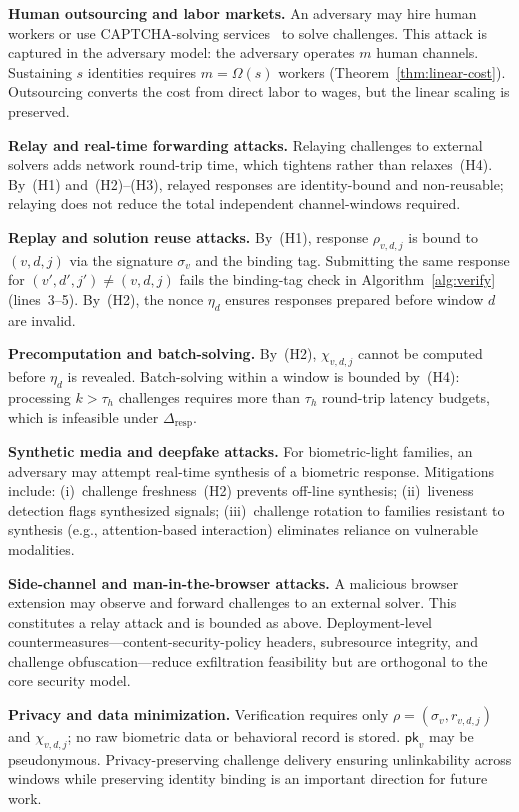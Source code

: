 \documentclass[11pt]{article}
\theoremstyle{remark}
\theoremstyle{plain}
\begin{document}
	\noindent\textbf{Human outsourcing and labor markets.}
	An adversary may hire human workers or use CAPTCHA-solving
	services~\cite{motoyama2010recaptchas} to solve challenges.
	This attack is captured in the adversary model: the adversary operates
	$m$ human channels. Sustaining $s$ identities requires $m = \Omega(s)$
	workers (Theorem~\ref{thm:linear-cost}). Outsourcing converts the cost
	from direct labor to wages, but the linear scaling is preserved.
	
	\noindent\textbf{Relay and real-time forwarding attacks.}
	Relaying challenges to external solvers adds network round-trip time,
	which tightens rather than relaxes~(H4). By~(H1) and~(H2)--(H3),
	relayed responses are identity-bound and non-reusable; relaying does
	not reduce the total independent channel-windows required.
	
	\noindent\textbf{Replay and solution reuse attacks.}
	By~(H1), response $\rho_{v,d,j}$ is bound to $(v,d,j)$ via the
	signature $\sigma_v$ and the binding tag. Submitting the same response
	for $(v',d',j') \neq (v,d,j)$ fails the binding-tag check in
	Algorithm~\ref{alg:verify} (lines~3--5). By~(H2), the nonce $\eta_d$
	ensures responses prepared before window $d$ are invalid.
	
	\noindent\textbf{Precomputation and batch-solving.}
	By~(H2), $\chi_{v,d,j}$ cannot be computed before $\eta_d$ is revealed.
	Batch-solving within a window is bounded by~(H4): processing $k > \tau_h$
	challenges requires more than $\tau_h$ round-trip latency budgets,
	which is infeasible under $\Delta_{\mathrm{resp}}$.
	
	\noindent\textbf{Synthetic media and deepfake attacks.}
	For biometric-light families, an adversary may attempt real-time synthesis
	of a biometric response. Mitigations include: (i)~challenge freshness~(H2)
	prevents off-line synthesis; (ii)~liveness detection flags synthesized
	signals; (iii)~challenge rotation to families resistant to synthesis
	(e.g., attention-based interaction) eliminates reliance on vulnerable
	modalities.
	
	\noindent\textbf{Side-channel and man-in-the-browser attacks.}
	A malicious browser extension may observe and forward challenges to an
	external solver. This constitutes a relay attack and is bounded as above.
	Deployment-level countermeasures---content-security-policy headers,
	subresource integrity, and challenge obfuscation---reduce exfiltration
	feasibility but are orthogonal to the core security model.
	
	\noindent\textbf{Privacy and data minimization.}
	Verification requires only $\rho = (\sigma_v, r_{v,d,j})$ and
	$\chi_{v,d,j}$; no raw biometric data or behavioral record is stored.
	$\mathsf{pk}_v$ may be pseudonymous. Privacy-preserving challenge
	delivery ensuring unlinkability across windows while preserving identity
	binding is an important direction for future work.
	
\end{document}
